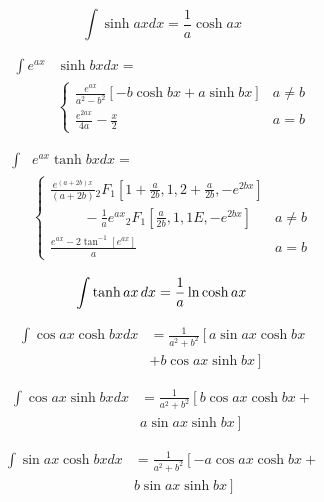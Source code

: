\documentclass[11pt,twoside]{article}
\begin{document}
\begin{multicols}{3}
\begin{footnotesize}
\begin{equation}
\int \sinh ax dx = \frac{1}{a} \cosh ax
\end{equation}

\begin{align}
\int e^{ax}& \sinh bx dx = \nonumber \\ &
\begin{cases}
\displaystyle{\frac{e^{ax}}{a^2-b^2} }[ -b \cosh bx + a \sinh bx ]  & a\ne b \\
\displaystyle{\frac{e^{2ax}}{4a} - \frac{x}{2}}  & a = b
\end{cases}
\end{align}

\begin{align}
\int & e^{ax} \tanh bx dx = \nonumber \\ &
\begin{cases}
\displaystyle{ \frac{ e^{(a+2b)x}}{(a+2b)}
{_2F_1}\left[ 1+\frac{a}{2b},1,2+\frac{a}{2b}, -e^{2bx}\right] }& \\
\displaystyle{
\hspace{1cm}-\frac{1}{a}e^{ax}{_2F_1}\left[ \frac{a}{2b},1,1E, -e^{2bx}\right]
}
 & a\ne b \\
\displaystyle{\frac{e^{ax}-2\tan^{-1}[e^{ax}]}{a} } & a = b
\end{cases}
\end{align}

\begin{equation}
\int  \tanh ax\hspace{1.5pt} dx =\frac{1}{a} \ln \cosh ax
\end{equation}

\begin{align}
\int \cos ax \cosh bx dx &=
\frac{1}{a^2 + b^2} \left[
a \sin ax \cosh bx  \right . \nonumber \\ & \left. + b \cos ax \sinh bx
\right]
\end{align}

\begin{align}
\int \cos ax \sinh bx dx& =
\frac{1}{a^2 + b^2} \left[
b \cos ax \cosh bx +
\right . \nonumber \\ & \left .
 a \sin ax \sinh bx
\right]
\end{align}

\begin{align}
\int \sin ax \cosh bx dx &=
\frac{1}{a^2 + b^2} \left[
-a \cos ax \cosh bx +
\right . \nonumber \\ & \left .
 b \sin ax \sinh bx
\right]
\end{align}


\end{footnotesize}
\end{multicols}
\end{document}
